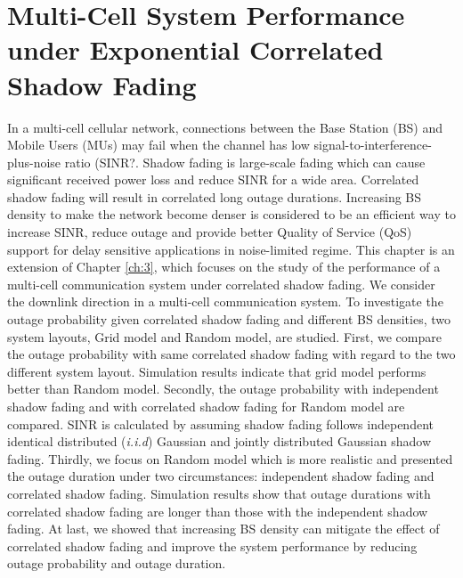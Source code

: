 \chapter{Multi-Cell System Performance under Exponential Correlated Shadow Fading}\label{ch:4}
\par In a multi-cell cellular network, connections between the Base Station (BS) and Mobile Users (MUs) may fail when the channel has low signal-to-interference-plus-noise ratio (SINR?. Shadow fading is large-scale fading which can cause significant received power loss and reduce SINR for a wide area. Correlated shadow fading will result in correlated long outage durations. Increasing BS density to make the network become denser is considered to be an efficient way to increase SINR, reduce outage and provide better Quality of Service (QoS) support for delay sensitive applications in noise-limited regime. This chapter is an extension of Chapter \ref{ch:3}, which focuses on the study of the performance of a multi-cell communication system under correlated shadow fading. We consider the downlink direction in a multi-cell communication system. To investigate the outage probability given correlated shadow fading and different BS densities, two system layouts, Grid model and Random model, are studied. First, we compare the outage probability with same correlated shadow fading with regard to the two different system layout. Simulation results indicate that grid model performs better than Random model. Secondly, the outage probability with independent shadow fading and with correlated shadow fading for Random model are compared. SINR is calculated by assuming shadow fading follows independent identical distributed (\emph{i.i.d}) Gaussian and jointly distributed Gaussian shadow fading. Thirdly, we focus on Random model which is more realistic and presented the outage duration under two circumstances: independent shadow fading and correlated shadow fading. Simulation results show that outage durations with correlated shadow fading are longer than those with the independent shadow fading. At last, we showed that increasing BS density can mitigate the effect of correlated shadow fading and improve the system performance by reducing outage probability and outage duration. 

